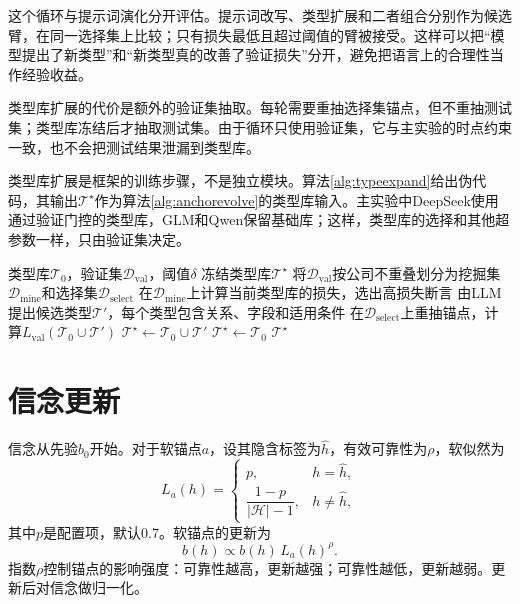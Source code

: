 这个循环与提示词演化分开评估。提示词改写、类型扩展和二者组合分别作为候选臂，在同一选择集上比较；只有损失最低且超过阈值的臂被接受。这样可以把“模型提出了新类型”和“新类型真的改善了验证损失”分开，避免把语言上的合理性当作经验收益。

类型库扩展的代价是额外的验证集抽取。每轮需要重抽选择集锚点，但不重抽测试集；类型库冻结后才抽取测试集。由于循环只使用验证集，它与主实验的时点约束一致，也不会把测试结果泄漏到类型库。

类型库扩展是框架的训练步骤，不是独立模块。算法\ref{alg:typeexpand}给出伪代码，其输出$\mathcal T^\star$作为算法\ref{alg:anchorevolve}的类型库输入。主实验中DeepSeek使用通过验证门控的类型库，GLM和Qwen保留基础库；这样，类型库的选择和其他超参数一样，只由验证集决定。

\begin{algorithm}[H]
\caption{类型库的验证集扩展}
\label{alg:typeexpand}
\begin{algorithmic}[1]
\Require 类型库$\mathcal T_0$，验证集$\mathcal D_{\mathrm{val}}$，阈值$\delta$
\Ensure 冻结类型库$\mathcal T^\star$
\State 将$\mathcal D_{\mathrm{val}}$按公司不重叠划分为挖掘集$\mathcal D_{\mathrm{mine}}$和选择集$\mathcal D_{\mathrm{select}}$
\State 在$\mathcal D_{\mathrm{mine}}$上计算当前类型库的损失，选出高损失断言
\State 由LLM提出候选类型$\mathcal T'$，每个类型包含关系、字段和适用条件
\State 在$\mathcal D_{\mathrm{select}}$上重抽锚点，计算$L_{\mathrm{val}}(\mathcal T_0\cup\mathcal T')$
\State $\mathcal T^\star\gets\mathcal T_0\cup\mathcal T'$
\Else
\State $\mathcal T^\star\gets\mathcal T_0$
\EndIf
\State \Return $\mathcal T^\star$ 
\end{algorithmic}
\end{algorithm}


\section{信念更新}

信念从先验$b_0$开始。对于软锚点$a$，设其隐含标签为$\hat h$，有效可靠性为$\rho$，软似然为
\begin{equation}
L_a(h)=
\begin{cases}
p, & h=\hat h,\\
\dfrac{1-p}{|\mathcal H|-1}, & h\ne\hat h,
\end{cases}
\label{eq:softlikelihood}
\end{equation}
其中$p$是配置项，默认0.7。软锚点的更新为
\begin{equation}
b(h)\propto b(h)\,L_a(h)^{\rho}.
\label{eq:softupdate}
\end{equation}
指数$\rho$控制锚点的影响强度：可靠性越高，更新越强；可靠性越低，更新越弱。更新后对信念做归一化。


